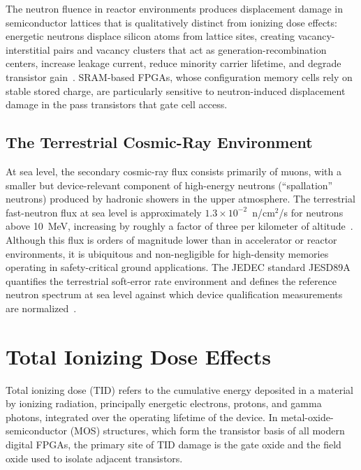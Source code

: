 The neutron fluence in reactor environments produces displacement
damage in semiconductor lattices that is qualitatively distinct
from ionizing dose effects: energetic neutrons displace silicon
atoms from lattice sites, creating vacancy-interstitial pairs and
vacancy clusters that act as generation-recombination centers,
increase leakage current, reduce minority carrier lifetime, and
degrade transistor gain~\cite{messenger1992effects}.  SRAM-based
FPGAs, whose configuration memory cells rely on stable stored
charge, are particularly sensitive to neutron-induced displacement
damage in the pass transistors that gate cell access.

\subsection{The Terrestrial Cosmic-Ray Environment}

At sea level, the secondary cosmic-ray flux consists primarily of
muons, with a smaller but device-relevant component of high-energy
neutrons (``spallation'' neutrons) produced by hadronic showers in
the upper atmosphere.  The terrestrial fast-neutron flux at sea level
is approximately $1.3 \times 10^{-2}$~n/cm$^2$/s for neutrons above
10~MeV, increasing by roughly a factor of three per kilometer of
altitude~\cite{normand1996single,ziegler1996terrestrial}.  Although
this flux is orders of magnitude lower than in accelerator or reactor
environments, it is ubiquitous and non-negligible for high-density
memories operating in safety-critical ground applications.  The
JEDEC standard JESD89A quantifies the terrestrial soft-error rate
environment and defines the reference neutron spectrum at sea level
against which device qualification measurements are
normalized~\cite{jedec2006jesd89a}.

\section{Total Ionizing Dose Effects}
\label{sec:TID}

Total ionizing dose (TID) refers to the cumulative energy deposited
in a material by ionizing radiation, principally energetic electrons,
protons, and gamma photons, integrated over the operating lifetime
of the device.  In metal-oxide-semiconductor (MOS) structures, which
form the transistor basis of all modern digital FPGAs, the primary
site of TID damage is the gate oxide and the field oxide used to
isolate adjacent transistors.

